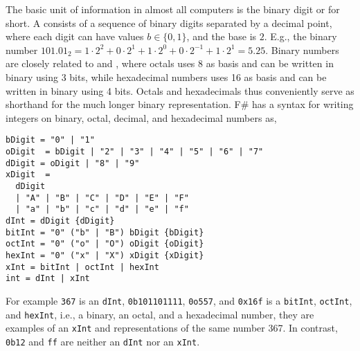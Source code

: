 The basic unit of information in almost all computers is the binary digit or  for short. A  consists of a sequence of binary digits separated by a decimal point, where each digit can have values $b \in \{0,1\}$, and the base is $2$. E.g., the binary number $101.01_2 = 1\cdot 2^2+0\cdot 2^1+1\cdot 2^0+0\cdot 2^{-1}+1\cdot 2^1=5.25$. Binary numbers are closely related to  and , where octals uses 8 as basis and can be written in binary using 3 bits, while hexadecimal numbers uses 16 as basis and can be written in binary using 4 bits. Octals and hexadecimals thus conveniently serve as shorthand for the much longer binary representation. F\# has a syntax for writing integers on binary, octal, decimal, and hexadecimal numbers as,
%
\begin{lstlisting}[language=ebnf]
bDigit = "0" | "1"
oDigit  = bDigit | "2" | "3" | "4" | "5" | "6" | "7"
dDigit = oDigit | "8" | "9"
xDigit  = 
  dDigit 
  | "A" | "B" | "C" | "D" | "E" | "F" 
  | "a" | "b" | "c" | "d" | "e" | "f" 
dInt = dDigit {dDigit}
bitInt = "0" ("b" | "B") bDigit {bDigit}
octInt = "0" ("o" | "O") oDigit {oDigit}
hexInt = "0" ("x" | "X") xDigit {xDigit}
xInt = bitInt | octInt | hexInt
int = dInt | xInt
\end{lstlisting}
%
For example \lstinline!367! is an \lstinline[language=ebnf]!dInt!, \lstinline!0b101101111!, \lstinline!0o557!, and \lstinline!0x16f! is a \lstinline[language=ebnf]!bitInt!, \lstinline[language=ebnf]!octInt!, and \lstinline[language=ebnf]!hexInt!, i.e., a binary, an octal, and a hexadecimal number, they are examples of an \lstinline[language=ebnf]!xInt! and representations of the same number 367. In contrast, \lstinline!0b12! and \lstinline!ff! are neither an \lstinline[language=ebnf]!dInt! nor an \lstinline[language=ebnf]!xInt!.

